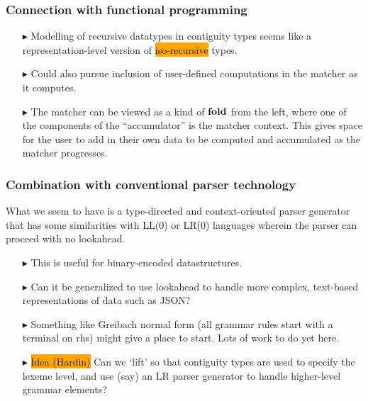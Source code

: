 \documentclass{beamer}
\newcommand{\kemph}[1]{\colorbox{orange}{#1}}
\newcommand{\konst}[1]{\ensuremath{\mbox{\bf{#1}}}}
\begin{document}
\begin{frame}\frametitle{Connection with functional programming}

\begin{itemize}

\item [$\blacktriangleright$] Modelling of recursive datatypes in
  contiguity types seems like a representation-level version of
  \kemph{iso-recursive} types.

\item [$\blacktriangleright$] Could also pursue inclusion of user-defined
  computations in the matcher as it computes.

\item [$\blacktriangleright$] The matcher can be viewed as a kind of
  \konst{fold} from the left, where one of the components of the
  ``accumulator'' is the matcher context. This gives space for the
  user to add in their own data to be computed and accumulated as the
  matcher progresses.


\end{itemize}

\end{frame}

\begin{frame}\frametitle{Combination with conventional parser technology}

What we seem to have is a type-directed and context-oriented parser
generator that has some similarities with LL(0) or LR(0) languages
wherein the parser can proceed with no lookahead.

\begin{itemize}

\item  [$\blacktriangleright$] This is useful for binary-encoded datastructures.

\item [$\blacktriangleright$] Can it be generalized to use lookahead
  to handle more complex, text-based representations of data such as
  JSON?

\item [$\blacktriangleright$] Something like Greibach normal form (all
  grammar rules start with a terminal on rhs) might give a place to
  start. Lots of work to do yet here.

\item [$\blacktriangleright$]
\kemph{Idea (Hardin)} Can we `lift' so that contiguity types are
  used to specify the lexeme level, and use (say) an LR parser
  generator to handle higher-level grammar elements?
\end{itemize}

\end{frame}
\end{document}
